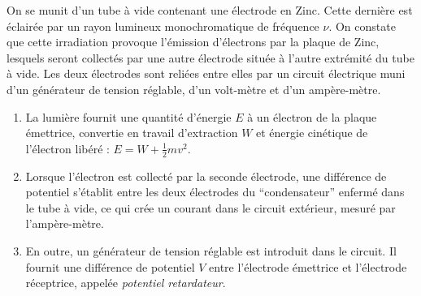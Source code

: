 On se munit d'un tube à vide contenant une électrode en Zinc. Cette dernière est éclairée par un rayon lumineux monochromatique de fréquence $\nu$. On constate que cette irradiation provoque l'émission d'électrons par la plaque de Zinc, lesquels seront collectés par une autre électrode située à l'autre extrémité du tube à vide. Les deux électrodes sont reliées entre elles par un circuit électrique muni d'un générateur de tension réglable, d'un volt-mètre et d'un ampère-mètre. 
\begin{enumerate}
\item La lumière fournit une quantité d'énergie $E$ à un électron de la plaque émettrice, convertie en travail d'extraction $W$ et énergie cinétique de l'électron libéré : $E = W + \frac{1}{2}mv^2$.
\item Lorsque l'électron est collecté par la seconde électrode, une différence de potentiel s'établit entre les deux électrodes du ``condensateur'' enfermé dans le tube à vide, ce qui crée un courant dans le circuit extérieur, mesuré par l'ampère-mètre. 
\item En outre, un générateur de tension réglable est introduit dans le circuit. Il fournit une différence de potentiel $V$ entre l'électrode émettrice et l'électrode réceptrice, appelée \textit{potentiel retardateur}.
\end{enumerate} 
$ $\\

\pagebreak

